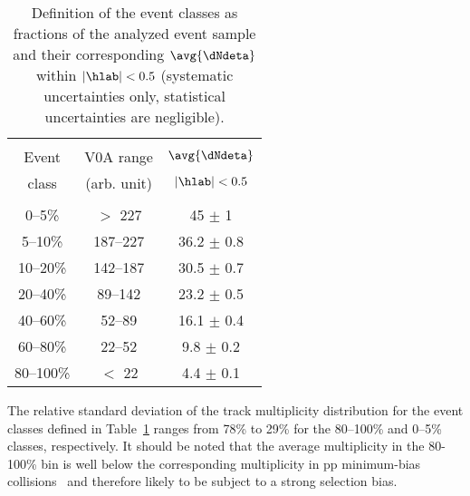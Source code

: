 \begin{table}[t] 
  \centering
  \begin{tabular*}{\linewidth}{@{\extracolsep{\fill}}ccc}
    \hline
    &&\\[-0.7em]
     Event & V0A range & $\avg{\dNdeta}$\\
     class & \footnotesize{(arb. unit)} & \footnotesize{$|\hlab|<0.5$}\\[0.3em]
    \hline
    &&\\[-0.7em]
    0--5\%    & $>$ 227  & 45   $\pm$ 1   \\[0.3em]
    5--10\%   & 187--227 & 36.2 $\pm$ 0.8 \\[0.3em]
    10--20\%  & 142--187 & 30.5 $\pm$ 0.7 \\[0.3em]
    20--40\%  & 89--142  & 23.2 $\pm$ 0.5 \\[0.3em] 
    40--60\%  & 52--89   & 16.1 $\pm$ 0.4 \\[0.3em]
    60--80\%  & 22--52   & 9.8  $\pm$ 0.2 \\[0.3em]
    80--100\% & $<$ 22   & 4.4  $\pm$ 0.1 \\[0.3em]
    \hline
  \end{tabular*}
  \caption{Definition of the event classes as fractions of the analyzed event sample and their corresponding $\avg{\dNdeta}$ within $|\hlab|<0.5$ (systematic uncertainties only, statistical uncertainties are negligible). }
  \label{tab:multclasses}
\end{table}


The relative standard deviation of the track multiplicity
distribution for the event classes defined in
Table~\ref{tab:multclasses} ranges from 78\% to 29\% for
the 80--100\% and 0--5\% classes, respectively. It should be noted
that the average multiplicity in the 80-100\% bin is well below the
corresponding multiplicity in pp minimum-bias
collisions~\cite{Aamodt:1260702} and therefore likely to be subject to
a strong selection bias. 

